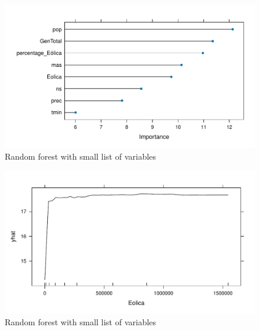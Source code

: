 \documentclass[
]{report}
\begin{document}
\begin{figure}

{\centering \includegraphics{Modelling_Energy_Intensity-V3_files/figure-pdf/unnamed-chunk-9-1.pdf}

}

\caption{Random forest with small list of variables}

\end{figure}

\begin{figure}

{\centering \includegraphics{Modelling_Energy_Intensity-V3_files/figure-pdf/unnamed-chunk-9-2.pdf}

}

\caption{Random forest with small list of variables}

\end{figure}
\end{document}
